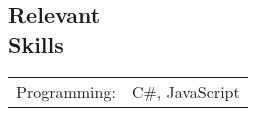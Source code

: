 \documentclass[margin,line,pifont,palatino,courier]{res}
\begin{document}
\begin{resume}

\section{\sc Relevant \\ Skills}

\begin{tabular}{@{}p{0.8in}p{6in}}

Programming:& C\#, JavaScript\\

\end{tabular}




\end{resume}
\end{document}
